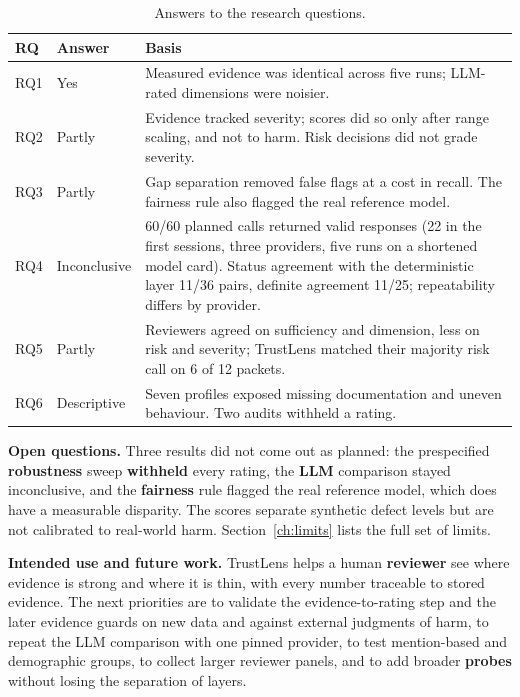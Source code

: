 \begin{table}[!htbp]
\centering\small
\caption{Answers to the research questions.}\label{tab:rq}
\begin{tabularx}{\textwidth}{|>{\raggedright\arraybackslash}p{1.0cm}|>{\raggedright\arraybackslash}p{2.0cm}|L|}
\hline
\textbf{RQ} & \textbf{Answer} & \textbf{Basis}\\
\hline
RQ1 & Yes & Measured evidence was identical across five runs; LLM-rated dimensions were noisier.\\ \hline
RQ2 & Partly & Evidence tracked severity; scores did so only after range scaling, and not to harm. Risk decisions did not grade severity.\\ \hline
RQ3 & Partly & Gap separation removed false flags at a cost in recall. The fairness rule also flagged the real reference model.\\ \hline
RQ4 & Inconclusive & 60/60 planned calls returned valid responses (22 in the first sessions, three providers, five runs on a shortened model card). Status agreement with the deterministic layer 11/36 pairs, definite agreement 11/25; repeatability differs by provider.\\ \hline
RQ5 & Partly & Reviewers agreed on sufficiency and dimension, less on risk and severity; TrustLens matched their majority risk call on 6 of 12 packets.\\ \hline
RQ6 & Descriptive & Seven profiles exposed missing documentation and uneven behaviour. Two audits withheld a rating.\\
\hline
\end{tabularx}
\end{table}

\textbf{Open questions.} Three results did not come out as planned: the prespecified \textbf{robustness} sweep \textbf{withheld} every rating, the \textbf{LLM} comparison stayed inconclusive, and the \textbf{fairness} rule flagged the real reference model, which does have a measurable disparity. The scores separate synthetic defect levels but are not calibrated to real-world harm. Section~\ref{ch:limits} lists the full set of limits.

\textbf{Intended use and future work.} TrustLens helps a human \textbf{reviewer} see where evidence is strong and where it is thin, with every number traceable to stored evidence. The next priorities are to validate the evidence-to-rating step and the later evidence guards on new data and against external judgments of harm, to repeat the LLM comparison with one pinned provider, to test mention-based and demographic groups, to collect larger reviewer panels, and to add broader \textbf{probes} without losing the separation of layers.
